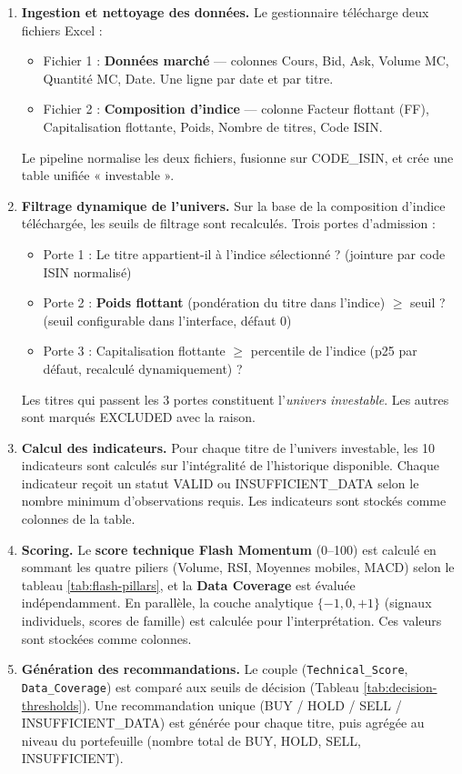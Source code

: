 \documentclass{rapportENSIAS} %
\begin{document}
\begin{enumerate}
    \item \textbf{Ingestion et nettoyage des données.} Le gestionnaire télécharge deux fichiers Excel :
        \begin{itemize}
            \item Fichier 1 : \textbf{Données marché} — colonnes Cours, Bid, Ask, Volume MC, Quantité MC, Date. Une ligne par date et par titre.
            \item Fichier 2 : \textbf{Composition d'indice} — colonne Facteur flottant (FF), Capitalisation flottante, Poids, Nombre de titres, Code ISIN.
        \end{itemize}
        Le pipeline normalise les deux fichiers, fusionne sur CODE\_ISIN, et crée une table unifiée « investable ».
    
    \item \textbf{Filtrage dynamique de l'univers.} Sur la base de la composition d'indice téléchargée, les seuils de filtrage sont recalculés. Trois portes d'admission :
        \begin{itemize}
            \item Porte 1 : Le titre appartient-il à l'indice sélectionné ? (jointure par code ISIN normalisé)
            \item Porte 2 : \textbf{Poids flottant} (pondération du titre dans l'indice) $\ge$ seuil ? (seuil configurable dans l'interface, défaut 0)
            \item Porte 3 : Capitalisation flottante $\ge$ percentile de l'indice (p25 par défaut, recalculé dynamiquement) ?
        \end{itemize}
        Les titres qui passent les 3 portes constituent l'\textit{univers investable}. Les autres sont marqués EXCLUDED avec la raison.
    
    \item \textbf{Calcul des indicateurs.} Pour chaque titre de l'univers investable, les 10 indicateurs sont calculés sur l'intégralité de l'historique disponible. Chaque indicateur reçoit un statut VALID ou INSUFFICIENT\_DATA selon le nombre minimum d'observations requis. Les indicateurs sont stockés comme colonnes de la table.
    
    \item \textbf{Scoring.} Le \textbf{score technique Flash Momentum} (0--100) est calculé en sommant les quatre piliers (Volume, RSI, Moyennes mobiles, MACD) selon le tableau \ref{tab:flash-pillars}, et la \textbf{Data Coverage} est évaluée indépendamment. En parallèle, la couche analytique $\{-1,0,+1\}$ (signaux individuels, scores de famille) est calculée pour l'interprétation. Ces valeurs sont stockées comme colonnes.
    
    \item \textbf{Génération des recommandations.} Le couple (\texttt{Technical\_Score}, \texttt{Data\_Coverage}) est comparé aux seuils de décision (Tableau \ref{tab:decision-thresholds}). Une recommandation unique (BUY / HOLD / SELL / INSUFFICIENT\_DATA) est générée pour chaque titre, puis agrégée au niveau du portefeuille (nombre total de BUY, HOLD, SELL, INSUFFICIENT).
\end{enumerate}
\end{document}
